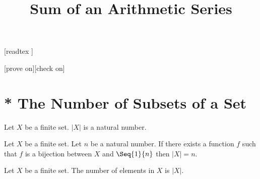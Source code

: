 \documentclass{article}
\title{Sum of an Arithmetic Series}
\author{}
\date{}
\begin{document}
\maketitle

\begin{forthel}

    [readtex ]

    [prove on][check on]
  \end{forthel}

\section{* The Number of Subsets of a Set}

\begin{forthel}
\begin{definition}
Let $X$ be a finite set.
$|X|$ is a natural number.
\end{definition}

\begin{axiom}
Let $X$ be a finite set. Let $n$ be a natural number.
If there exists a function $f$ such that $f$ is a bijection between $X$ and $\Seq{1}{n}$ then $|X|=n$.
\end{axiom}

\begin{definition}
Let $X$ be a finite set.
The number of elements in $X$ is $|X|$.
\end{definition}



\end{forthel}
\end{document}
